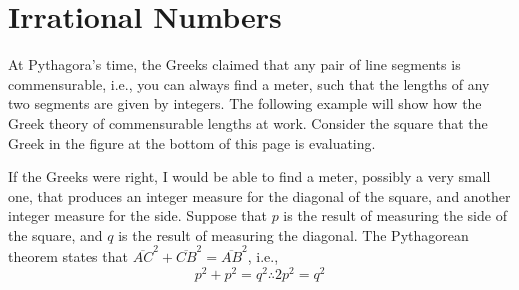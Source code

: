 \documentclass[a4paper,12pt]{book}
\begin{document}
\section{Irrational Numbers}
At Pythagora's time, the Greeks claimed that
any pair of line segments is commensurable, i.e.,
you can always find a meter,
such that the lengths of any two segments
are given by integers.  The following
 example will
show how the Greek theory of commensurable lengths at work.
Consider the square that the Greek in the figure
at the bottom of this page is evaluating.


If the Greeks were right, I would be able to find a meter, possibly a very small one,
 that produces an integer measure for the diagonal of the square,
 and another integer measure for the side. Suppose that $p$ is the
 result of measuring the side of the square, and $q$ is the result of measuring the diagonal.
The Pythagorean theorem states that
$\overline{AC}^2+\overline{CB}^2= \overline{AB}^2$, i.e.,
\begin{equation}
p^2+p^2= q^2\therefore 2p^2=q^2\label{Pytagoras1}
\end{equation}
\end{document}
